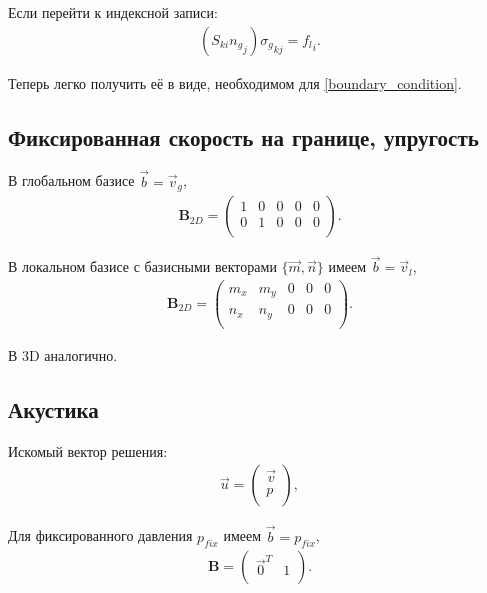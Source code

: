 Если перейти к индексной записи:
\begin{eqnarray}
	(S_{ki} {n_g}_j) {\sigma_g}_{kj} = {f_l}_i.
\end{eqnarray}

Теперь легко получить её в виде, необходимом для \eqref{boundary_condition}.


\subsection{Фиксированная скорость на границе, упругость}

В глобальном базисе $\vec{b} = \vec{v}_g$,
\begin{align}
\label{fixed_velocity_global_basis}
	\mathbf{B}_{2D} =
	\left( \begin{array}{cccccccccccc}
	 1 & 0 & 0 & 0 & 0 \\
	 0 & 1 & 0 & 0 & 0 \\
	\end{array} \right).
\end{align}

В локальном базисе с базисными векторами $\{\vec{m}, \vec{n}\}$ имеем $\vec{b} = \vec{v}_l$,
\begin{align}
	\mathbf{B}_{2D} =
	\left( \begin{array}{cccccccccccc}
	 m_x & m_y & 0 & 0 & 0 \\
	 n_x & n_y & 0 & 0 & 0 \\
	\end{array} \right).
\end{align}

В 3D аналогично.


\subsection{Акустика}
Искомый вектор решения:
\begin{align}
	\vec{u} =
	\left( \begin{array}{cccccccccccc}
	 \vec{v} \\
	 p \\
	\end{array} \right),
\end{align}

Для фиксированного давления $p_{fix}$ имеем $\vec{b} = p_{fix}$,
\begin{align}
\label{fixed_pressure_acoustic}
	\mathbf{B} =
	\left( \begin{array}{cccccccccccc}
	 \vec{0}^T & 1 \\
	\end{array} \right).
\end{align}

